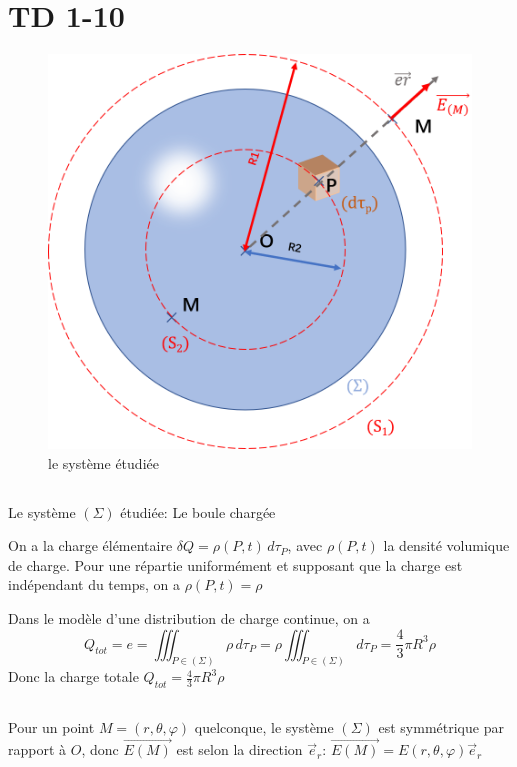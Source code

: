 \documentclass[a4paper,12pt]{book}
\begin{document}
\renewcommand{\labelitemi}{$\blacktriangleright$}
\renewcommand{\labelitemii}{$\bullet$}


\section{TD 1-10}
\begin{figure}[h]
    \begin{center}
    \includegraphics[scale=0.6]{elec21.png}
    \end{center}
    \caption{le système étudiée}
\end{figure}
\subsection{}
Le système $(\Sigma)$ étudiée: Le boule chargée

On a la charge élémentaire $\delta Q=\rho(P,t)\,d\tau_P$, avec $\rho(P,t)$ la densité volumique de charge.
Pour une répartie uniformément et supposant que la charge est indépendant du temps, on a $\rho(P,t)=\rho$

Dans le modèle d'une distribution de charge continue, on a 
$$
Q_{tot}=e=\iiint_{P \in (\Sigma)} \rho\,d\tau_P=\rho\iiint_{P \in (\Sigma)}d\tau_P=\frac{4}{3}\pi R^3\rho
$$
Donc la charge totale $\boxed{Q_{tot}=\frac{4}{3}\pi R^3\rho}$
\subsection{}
Pour un point $M=(r,\theta,\varphi)$ quelconque, le système $(\Sigma)$ est symmétrique par rapport à $O$, donc $\overrightarrow{E(M)}$ est selon la direction $\vec{e}_r$: $\overrightarrow{E(M)}=E(r,\theta,\varphi)\vec{e}_r$
\end{document}
